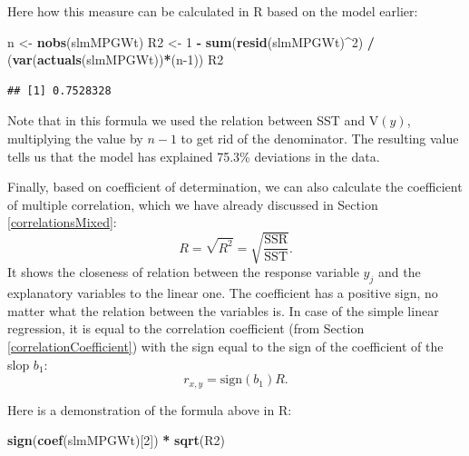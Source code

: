 \documentclass[
]{book}
\newenvironment{Shaded}{\begin{snugshade}}{\end{snugshade}}
\newcommand{\DecValTok}[1]{\textcolor[rgb]{0.00,0.00,0.81}{#1}}
\newcommand{\KeywordTok}[1]{\textcolor[rgb]{0.13,0.29,0.53}{\textbf{#1}}}
\newcommand{\NormalTok}[1]{#1}
\newcommand{\OperatorTok}[1]{\textcolor[rgb]{0.81,0.36,0.00}{\textbf{#1}}}
\newcommand{\StringTok}[1]{\textcolor[rgb]{0.31,0.60,0.02}{#1}}
\theoremstyle{definition}
\theoremstyle{definition}
\theoremstyle{definition}
\theoremstyle{definition}
\theoremstyle{remark}
\begin{document}
Here how this measure can be calculated in R based on the model earlier:

\begin{Shaded}
\begin{Highlighting}[]
\NormalTok{n \textless{}{-}}\StringTok{ }\KeywordTok{nobs}\NormalTok{(slmMPGWt)}
\NormalTok{R2 \textless{}{-}}\StringTok{ }\DecValTok{1} \OperatorTok{{-}}\StringTok{ }\KeywordTok{sum}\NormalTok{(}\KeywordTok{resid}\NormalTok{(slmMPGWt)}\OperatorTok{\^{}}\DecValTok{2}\NormalTok{) }\OperatorTok{/}
\StringTok{    }\NormalTok{(}\KeywordTok{var}\NormalTok{(}\KeywordTok{actuals}\NormalTok{(slmMPGWt))}\OperatorTok{*}\NormalTok{(n}\DecValTok{{-}1}\NormalTok{))}
\NormalTok{R2}
\end{Highlighting}
\end{Shaded}

\begin{verbatim}
## [1] 0.7528328
\end{verbatim}

Note that in this formula we used the relation between SST and V\((y)\), multiplying the value by \(n-1\) to get rid of the denominator. The resulting value tells us that the model has explained 75.3\% deviations in the data.

Finally, based on coefficient of determination, we can also calculate the coefficient of multiple correlation, which we have already discussed in Section \ref{correlationsMixed}:
\begin{equation}
    R = \sqrt{R^2} = \sqrt{\frac{\mathrm{SSR}}{\mathrm{SST}}} .
    \label{eq:multipleCorrelation}
\end{equation}
It shows the closeness of relation between the response variable \(y_j\) and the explanatory variables to the linear one. The coefficient has a positive sign, no matter what the relation between the variables is. In case of the simple linear regression, it is equal to the correlation coefficient (from Section \ref{correlationCoefficient}) with the sign equal to the sign of the coefficient of the slop \(b_1\):
\begin{equation}
    r_{x,y} = \mathrm{sign} (b_1) R .
    \label{eq:correlationInRegression}
\end{equation}

Here is a demonstration of the formula above in R:

\begin{Shaded}
\begin{Highlighting}[]
\KeywordTok{sign}\NormalTok{(}\KeywordTok{coef}\NormalTok{(slmMPGWt)[}\DecValTok{2}\NormalTok{]) }\OperatorTok{*}\StringTok{ }\KeywordTok{sqrt}\NormalTok{(R2)}
\end{Highlighting}
\end{Shaded}
\end{document}
